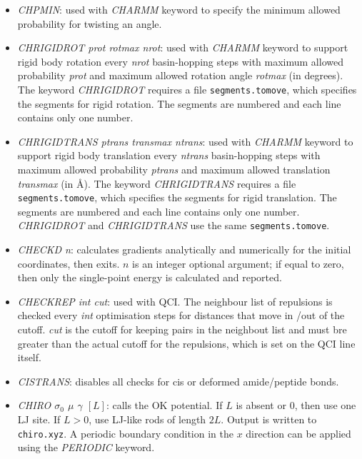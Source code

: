 \documentclass[12pt,a4paper,dvips]{article}
\begin{document}
\begin{itemize}
\item{\it CHPMIN}: used with {\it CHARMM} keyword to specify the minimum allowed
probability for twisting an angle.

\item{\it CHRIGIDROT prot rotmax nrot}: used with {\it CHARMM} keyword 
to support rigid body rotation every {\it nrot} basin-hopping steps with maximum allowed 
probability {\it prot} and maximum allowed rotation angle {\it rotmax} (in degrees). 
The keyword {\it CHRIGIDROT} requires a file {\tt segments.tomove}, which specifies
the segments for rigid rotation. The segments are numbered and each line contains only one number.

\item{\it CHRIGIDTRANS ptrans transmax ntrans}: used with {\it CHARMM} keyword 
to support rigid body translation every {\it ntrans} basin-hopping steps with maximum allowed 
probability {\it ptrans} and maximum allowed translation {\it transmax} (in \AA). 
The keyword {\it CHRIGIDTRANS} requires a file {\tt segments.tomove}, which specifies
the segments for rigid translation. The segments are numbered and each line contains only one number.
{\it CHRIGIDROT} and {\it CHRIGIDTRANS} use the same {\tt segments.tomove}.


\item {\it CHECKD n\/}: calculates gradients analytically and numerically for the initial coordinates, then exits. $n$ is an 
integer optional argument; if equal to zero, then only the single-point energy is calculated and reported.

\item {\it CHECKREP int cut\/}: used with QCI. The neighbour list of repulsions is checked every
{\it int} optimisation steps for distances that move in /out of the cutoff. 
{\it cut} is the cutoff for keeping pairs in the neighbout list and must bre greater
than the actual cutoff for the repulsions, which is set on the QCI line itself.

\item {\it CISTRANS\/}: disables all checks for cis or deformed amide/peptide bonds.

\item {\it CHIRO $\sigma_0$ $\mu$ $\gamma$ $[L]$}: calls the OK potential. If $L$ is absent or $0$, then use one LJ site. If $L > 0$, use LJ-like rods of length $2L$. Output is written to {\tt chiro.xyz}. A periodic boundary condition in the $x$ direction can be applied using the {\it PERIODIC} keyword.


\end{itemize}
\end{document}
